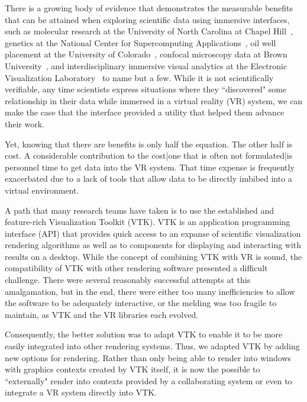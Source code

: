 There is a growing body of evidence that demonstrates the measurable benefits that can be
attained when exploring scientific data using immersive interfaces, such as
molecular research at the University of North Carolina at Chapel Hill~\cite{Brooks:1990},
genetics at the National Center for Supercomputing Applications~\cite{Brady:1995},
oil well placement at the University of Colorado~\cite{Gruchalla:2004},  confocal microscopy data at Brown University~\cite{Prabhat:2008}, and interdisciplinary immersive visual analytics at the Electronic Visualization Laboratory~\cite{Marai:2016} to name but a few.
While it is not scientifically verifiable, any time scientists
express situations where they ``discovered" some relationship in their data
while immersed in a virtual reality (VR) system, we can make the case that the
interface provided a utility that helped them advance their work.

Yet, knowing that there are benefits is only half the equation.
The other half is cost.
A considerable contribution to the cost|one that is often not
formulated|is personnel time to get data into the VR system.
That time expense is frequently exacerbated due to a lack of tools that
allow data to be directly imbibed into a virtual environment.

A path that many research teams have taken is to use the established and
feature-rich Visualization Toolkit (VTK).
VTK is an application programming interface (API) that provides quick access to an expanse
of scientific visualization rendering algorithms as well as to components
for displaying and interacting with results on a desktop.
While the concept of combining VTK with VR is sound, the
compatibility of VTK with other rendering software presented a difficult
challenge.  
There were several reasonably successful attempts at this amalgamation,
but in the end, there were either too many inefficiencies to allow the
software to be adequately interactive, or the melding was too fragile to
maintain, as VTK and the VR libraries each evolved.

Consequently, the better solution was to adapt VTK to enable it to be
more easily integrated into other rendering systems.
Thus, we adapted VTK by adding new options for rendering.
Rather than only being able to render into windows with graphics contexts
created by VTK itself, it is now the possible to ``externally" render
into contexts provided by a collaborating system or even to integrate a
VR system directly into VTK.

